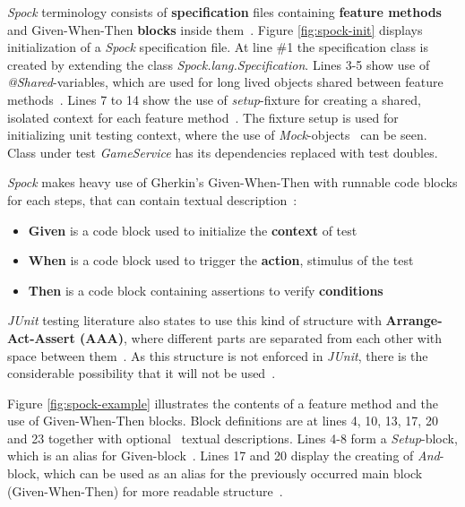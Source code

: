     \textit{Spock} terminology consists of \textbf{specification} files containing \textbf{feature methods} and Given-When-Then
    \textbf{blocks} inside them~\cite{spock}. Figure \ref{fig:spock-init} displays initialization of a \textit{Spock} specification
    file. At line \#1 the specification class is created by extending the class \textit{Spock.lang.Specification}. Lines
    3-5 show use of \textit{@Shared}-variables, which are used for long lived objects shared between feature methods~\cite{spock}.
    Lines 7 to 14 show the use of \textit{setup}-fixture for creating a shared, isolated context for each feature method~\cite{spock}.
    The fixture setup is used for initializing unit testing context, where the use of \textit{Mock}-objects~\cite{spock} can be seen.
    Class under test \textit{GameService} has its dependencies replaced with test doubles.

    \textit{Spock} makes heavy use of Gherkin's Given-When-Then with runnable code blocks for each steps, that can contain textual
    description~\cite{kapelonis2016java}:
    \begin{itemize}
    \item \textbf{Given} is a code block used to initialize the \textbf{context} of test
    \item \textbf{When} is a code block used to trigger the \textbf{action}, stimulus of the test
    \item \textbf{Then} is a code block containing assertions to verify \textbf{conditions}
    \end{itemize}
    \textit{JUnit} testing literature also states to use this kind of structure with \textbf{Arrange-Act-Assert (AAA)},
    where different parts are separated from each other with space between them~\cite{langr2015pragmatic}.
    As this structure is not enforced in \textit{JUnit}, there is the considerable possibility that it will not be used~\cite{kapelonis2016java}.

    Figure \ref{fig:spock-example} illustrates the contents of a feature method and the use of Given-When-Then blocks.
    Block definitions are at lines 4, 10, 13, 17, 20 and 23 together
    with optional~\cite{spock} textual descriptions.
    Lines 4-8 form a \textit{Setup}-block, which is an alias for Given-block~\cite{spock}.
    Lines 17 and 20 display the creating of \textit{And}-block, which can be used as
    an alias for the previously occurred main block (Given-When-Then) for more readable structure~\cite{kapelonis2016java}.

